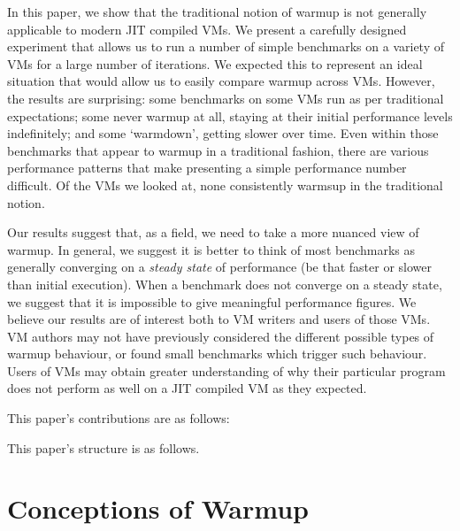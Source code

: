 \documentclass[10pt,preprint]{sigplanconf}
\begin{document}
In this paper, we show that the traditional notion of warmup is not generally
applicable to modern JIT compiled VMs. We present a carefully designed
experiment that allows us to run a number of simple benchmarks on a variety of
VMs for a large number of iterations. We expected this to represent an ideal
situation that would allow us to easily compare warmup across VMs. However, the
results are surprising: some benchmarks on some VMs run as per traditional
expectations; some never warmup at all, staying at their initial performance
levels indefinitely; and some `warmdown', getting slower over time. Even within
those benchmarks that appear to warmup in a traditional fashion, there are
various performance patterns that make presenting a simple performance number
difficult.  Of the  VMs we looked at,
none consistently warmsup in the traditional notion.

Our results suggest that, as a field, we need to take a more nuanced view
of warmup. In general, we suggest it is better to think of most benchmarks as
generally converging on a \emph{steady state} of performance (be that faster or
slower than initial execution). When a benchmark does not converge on a steady
state, we suggest that it is impossible to give meaningful performance figures.
We believe our results are of interest both to VM writers and users of those
VMs. VM authors may not have previously considered the different possible types
of warmup behaviour, or found small benchmarks which trigger such behaviour.
Users of VMs may obtain greater understanding of why their particular program
does not perform as well on a JIT compiled VM as they expected.

This paper's contributions are as follows:
\begin{enumerate*}
  \item {}
\end{enumerate*}

This paper's structure is as follows. 


\section{Conceptions of Warmup}
\label{sec:warmup}
\end{document}
